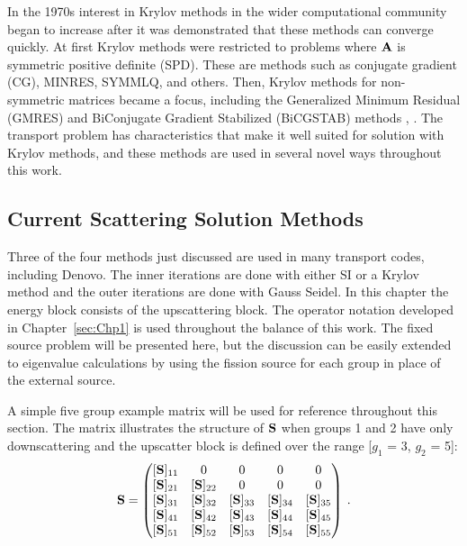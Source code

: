 In the 1970s interest in Krylov methods in the wider computational community began to increase after it was demonstrated that these methods can converge quickly. At first Krylov methods were restricted to problems where $\mathbf{A}$ is symmetric positive definite (SPD). These are methods such as conjugate gradient (CG), MINRES, SYMMLQ, and others. Then, Krylov methods for non-symmetric matrices became a focus, including the Generalized Minimum Residual (GMRES) and BiConjugate Gradient Stabilized (BiCGSTAB) methods \cite{Barrett1994}, \cite{Benzi2002}. The transport problem has characteristics that make it well suited for solution with Krylov methods, and these methods are used in several novel ways throughout this work.

\subsection{Current Scattering Solution Methods}
Three of the four methods just discussed are used in many transport codes, including Denovo. The inner iterations are done with either SI or a Krylov method and the outer iterations are done with Gauss Seidel. In this chapter the energy block consists of the upscattering block. The operator notation developed in Chapter~\ref{sec:Chp1} is used throughout the balance of this work. The fixed source problem will be presented here, but the discussion can be easily extended to eigenvalue calculations by using the fission source for each group in place of the external source. 

A simple five group example matrix will be used for reference throughout this section. The matrix illustrates the structure of $\mathbf{S}$  when groups 1 and 2 have only downscattering and the upscatter block is defined over the range [$g_{1}$ = 3, $g_{2}$ = 5]:
%
\begin{equation}
  \mathbf{S}  =     \begin{pmatrix}
      [\ve{S}]_{11} &0 & 0 & 0 & 0 \\
      [\ve{S}]_{21} & [\ve{S}]_{22} & 0 & 0 & 0 \\
      [\ve{S}]_{31} & [\ve{S}]_{32} & [\ve{S}]_{33} & [\ve{S}]_{34} & [\ve{S}]_{35} \\
      [\ve{S}]_{41} & [\ve{S}]_{42} & [\ve{S}]_{43} & [\ve{S}]_{44} & [\ve{S}]_{45} \\
      [\ve{S}]_{51} & [\ve{S}]_{52} & [\ve{S}]_{53} & [\ve{S}]_{54} & [\ve{S}]_{55}
    \end{pmatrix} \:.
    \label{eq:exmp-matrix}
\end{equation}

